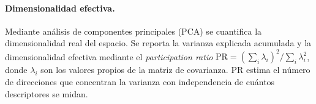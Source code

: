 \paragraph{Dimensionalidad efectiva.} Mediante análisis de componentes
principales (PCA) se cuantifica la dimensionalidad real del espacio. Se reporta
la varianza explicada acumulada y la dimensionalidad efectiva mediante el
\textit{participation ratio} $\mathrm{PR}=\left(\sum_i \lambda_i\right)^2 / \sum_i \lambda_i^2$,
donde $\lambda_i$ son los valores propios de la matriz de covarianza. PR estima
el número de direcciones que concentran la varianza con independencia de cuántos
descriptores se midan.

